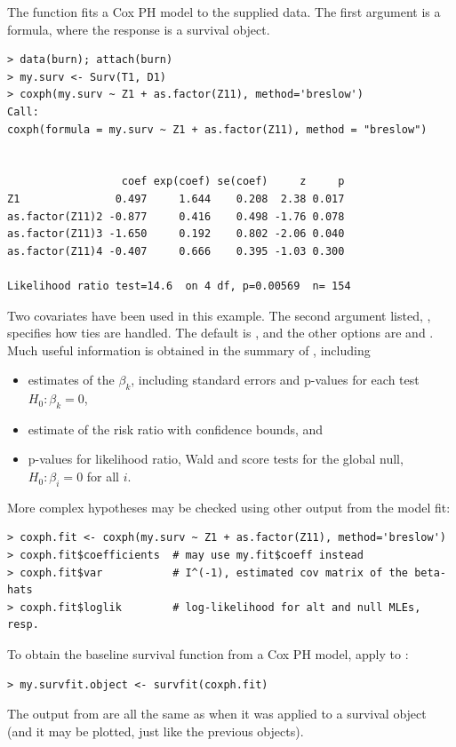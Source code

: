 \documentclass[11pt]{article}
\begin{document}
The function  fits a Cox PH model to the supplied data. The first argument is a formula, where the response is a survival object. %
\begin{verbatim}
> data(burn); attach(burn)
> my.surv <- Surv(T1, D1)
> coxph(my.surv ~ Z1 + as.factor(Z11), method='breslow')
Call:
coxph(formula = my.surv ~ Z1 + as.factor(Z11), method = "breslow")


                  coef exp(coef) se(coef)     z     p
Z1               0.497     1.644    0.208  2.38 0.017
as.factor(Z11)2 -0.877     0.416    0.498 -1.76 0.078
as.factor(Z11)3 -1.650     0.192    0.802 -2.06 0.040
as.factor(Z11)4 -0.407     0.666    0.395 -1.03 0.300

Likelihood ratio test=14.6  on 4 df, p=0.00569  n= 154 
\end{verbatim}
Two covariates have been used in this example. The second argument listed, , specifies how ties are handled. The default is , and the other options are  and . Much useful information is obtained in the summary of , including
\begin{itemize}
\item estimates of the $\beta_k$, including standard errors and p-values for each test $H_0: \beta_k=0$, %
\item estimate of the risk ratio with confidence bounds, and
\item p-values for likelihood ratio, Wald and score tests for the global null, $H_0: \beta_i =0$ for all $i$.
\end{itemize}
More complex hypotheses may be checked using other output from the model fit:
\begin{verbatim}
> coxph.fit <- coxph(my.surv ~ Z1 + as.factor(Z11), method='breslow')
> coxph.fit$coefficients  # may use my.fit$coeff instead
> coxph.fit$var           # I^(-1), estimated cov matrix of the beta-hats
> coxph.fit$loglik        # log-likelihood for alt and null MLEs, resp.
\end{verbatim}
To obtain the baseline survival function from a Cox PH model, apply  to :
\begin{verbatim}
> my.survfit.object <- survfit(coxph.fit)
\end{verbatim}
The output from  are all the same as when it was applied to a survival object (and it may be plotted, just like the previous  objects).
\end{document}

